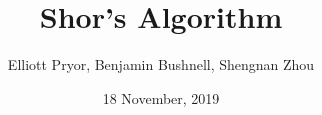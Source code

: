 \documentclass[a4paper]{article}
\title{Shor's Algorithm}
\author{Elliott Pryor, Benjamin Bushnell, Shengnan Zhou}
\date{18 November, 2019}
\begin{document}
\maketitle %



































\newpage
\nocite{*}


\end{document}
